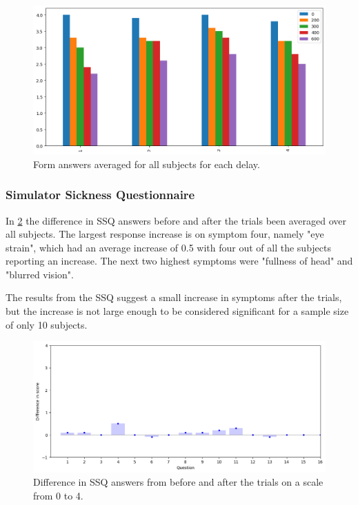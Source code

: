 \documentclass[nofilelist]{cslthse-msc}
\begin{document}
\begin{figure}[!hbt]
   \centering
   \includegraphics[scale=0.6]{images/form-ans.png} 
   \caption{Form answers averaged for all subjects for each delay.}
   \label{fig:form-ans}
\end{figure}

\subsubsection{Simulator Sickness Questionnaire}
In \ref{fig:ssq-ans} the difference in SSQ answers before and after the trials been averaged over all subjects. The largest response increase is on symptom four, namely "eye strain", which had an average increase of  0.5 with four out of all the subjects reporting an increase. The next two highest symptoms were "fullness of head" and "blurred vision". 

The results from the SSQ suggest a small increase in  symptoms after the trials, but the increase is not large enough to be considered significant for a sample size of only 10 subjects.

\begin{figure}[!hbt]
   \centering
   \includegraphics[scale=0.6]{images/ssq-results.png} 
   \caption{Difference in SSQ answers from before and after the trials on a scale from 0 to 4.}
   \label{fig:ssq-ans}
\end{figure}
\end{document}
